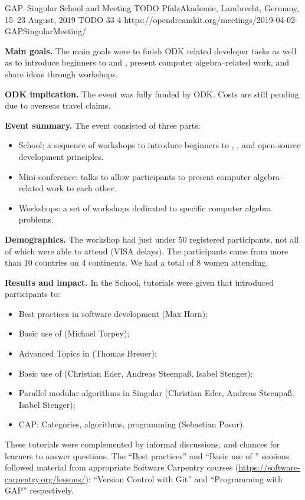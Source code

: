 \begin{event}
  {GAP--Singular School and Meeting}
  {TODO}  %
  {PfalzAkademie, Lambrecht, Germany, 15--23 August, 2019}
  {TODO}  %
  {33}
  {4}  %
  {https://opendreamkit.org/meetings/2019-04-02-GAPSingularMeeting/}

\textbf{Main goals.}
The main goals were to finish ODK related developer tasks as well as
  to introduce beginners to \GAP and \Singular, present
computer algebra--related work, and share ideas through workshops.

\textbf{ODK implication.}
The event was fully funded by ODK. Costs are still pending due to
overseas travel claims.

\textbf{Event summary.}
The event consisted of three parts:
\begin{itemize}
\item School: a sequence of workshops to introduce beginners to \GAP, \Singular,
  and open-source development principles.
\item Mini-conference: talks to allow participants to present computer
  algebra--related work to each other.
\item Workshops: a set of workshops dedicated to specific computer algebra
  problems.
\end{itemize}

\textbf{Demographics.}
The workshop had just under 50 registered participants, not all of which
  were able to attend (VISA delays).
The participants came from more than 10 countries on 4 continents.
We had a total of 8 women attending.

\textbf{Results and impact.}
In the School, tutorials were given that introduced participants to:
\begin{itemize}
\item Best practices in software development (Max Horn);
\item Basic use of \GAP (Michael Torpey);
\item Advanced Topics in \GAP (Thomas Breuer);
\item Basic use of \Singular (Christian Eder, Andreas Steenpaß, Isabel Stenger);
\item Parallel modular algorithms in Singular (Christian Eder, Andreas Steenpaß, Isabel Stenger);
\item CAP: Categories, algorithms, programming (Sebastian Posur).
\end{itemize}
These tutorials were complemented by informal discussions, and chances for
learners to answer questions.  The ``Best practices'' and ``Basic use of \GAP''
sessions followed material from appropriate Software Carpentry courses
(\url{https://software-carpentry.org/lessons/}): ``Version Control with Git''
and ``Programming with GAP'' respectively.


\end{event}
